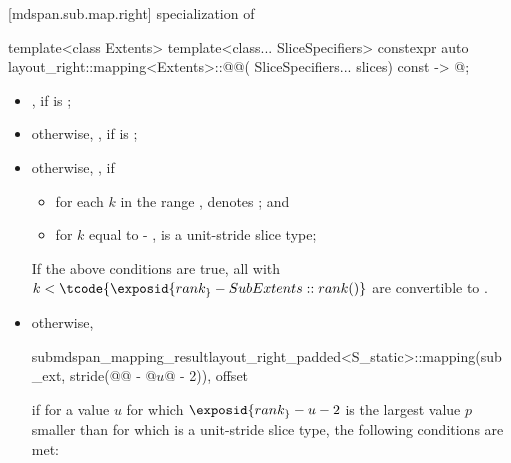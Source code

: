 [mdspan.sub.map.right]{ specialization of }

%
\begin{itemdecl}
template<class Extents>
template<class... SliceSpecifiers>
constexpr auto layout_right::mapping<Extents>::@@(
      SliceSpecifiers... slices) const -> @\seebelow@;
\end{itemdecl}

\begin{itemdescr}
\pnum
\returns
\begin{itemize}
\item
{},
if  is ;
\item
otherwise,
,\newline
if  is ;
\item
otherwise,
,
if
  \begin{itemize}
  \item
  for each $k$ in the range ,\newline
   denotes ; and
  \item
  for $k$ equal to  - ,
   is a unit-stride slice type;
  \end{itemize}
\begin{note}
If the above conditions are true,
all  with\newline
$k < \tcode{\exposid{rank_} - SubExtents::rank()}$
are convertible to .
\end{note}
\item
otherwise,
\begin{codeblock}
submdspan_mapping_result{layout_right_padded<S_static>::mapping(sub_ext,
                             stride(@@ - @$u$@ - 2)), offset}
\end{codeblock}
if for a value $u$ for which $\exposid{rank_} - u - 2$ is
the largest value $p$ smaller than 
for which  is a unit-stride slice type,
the following conditions are met:

\end{itemize}
\end{itemdescr}
